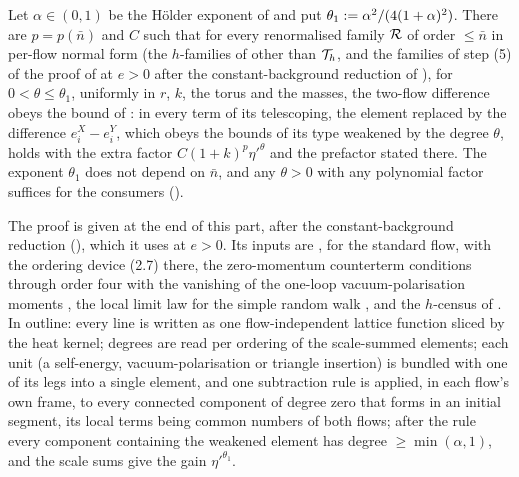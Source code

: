 \begin{theorem}\label{rot:thm:H1S}
Let $\alpha\in(0,1)$ be the H\"older exponent of \cite[(3.8)]{K1} and put $\theta_1:=\alpha^2/(4(1+\alpha)^2)$. There are $p=p(\bar n)$ and $C$ such that for every renormalised family $\mathcal R$ of order $\le\bar n$ in per-flow normal form (the $h$-families of  other than $\mathcal T_h$, and the families of step (5) of the proof of  at $e>0$ after the constant-background reduction of ), for $0<\theta\le\theta_1$, uniformly in $r$, $k$, the torus and the masses, the two-flow difference obeys the bound of : in every term of its telescoping, the element replaced by the difference $e^X_i-e^Y_i$, which obeys the bounds of its type weakened by the degree $\theta$, \cite[(1.33)]{Ba3} holds with the extra factor $C(1+k)^p\eta'^{\theta}$ and the prefactor stated there. The exponent $\theta_1$ does not depend on $\bar n$, and any $\theta>0$ with any polynomial factor suffices for the consumers ().
\end{theorem}
The proof is given at the end of this part, after the constant-background reduction (), which it uses at $e>0$. Its inputs are , \cite[Thm.~3.3]{K1} for the standard flow, \cite[Prop.~2.1, (2.8)]{Ba3} with the ordering device (2.7) there, the zero-momentum counterterm conditions \cite[(3.33)]{K1} through order four with the vanishing of the one-loop vacuum-polarisation moments \cite[(2.23)--(2.28)]{Ba3}, the local limit law for the simple random walk \cite[Thm.~2.5.6]{LL10}, and the $h$-census of . In outline: every line is written as one flow-independent lattice function sliced by the heat kernel; degrees are read per ordering of the scale-summed elements; each unit (a self-energy, vacuum-polarisation or triangle insertion) is bundled with one of its legs into a single element, and one subtraction rule is applied, in each flow's own frame, to every connected component of degree zero that forms in an initial segment, its local terms being common numbers of both flows; after the rule every component containing the weakened element has degree $\ge\min(\alpha,1)$, and the scale sums give the gain $\eta'^{\theta_1}$.

